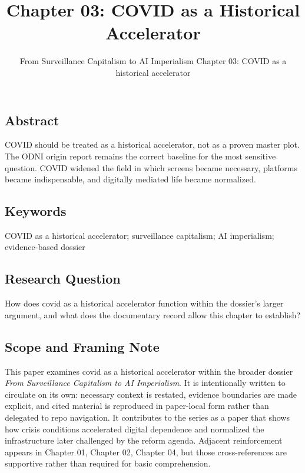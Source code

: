 \documentclass[
  american,
  11pt,
  letterpaper,
]{article}
\title{Chapter 03: COVID as a Historical Accelerator}
\subtitle{From Surveillance Capitalism to AI Imperialism \textbar{}
Chapter 03: COVID as a historical accelerator}
\author{}
\date{}
\begin{document}
\maketitle

\subsection{Abstract}\label{abstract}

COVID should be treated as a historical accelerator, not as a proven
master plot. The ODNI origin report remains the correct baseline for the
most sensitive question. COVID widened the field in which screens became
necessary, platforms became indispensable, and digitally mediated life
became normalized.

\subsection{Keywords}\label{keywords}

COVID as a historical accelerator; surveillance capitalism; AI
imperialism; evidence-based dossier

\subsection{Research Question}\label{research-question}

How does covid as a historical accelerator function within the dossier's
larger argument, and what does the documentary record allow this chapter
to establish?

\subsection{Scope and Framing Note}\label{scope-and-framing-note}

This paper examines covid as a historical accelerator within the broader
dossier \emph{From Surveillance Capitalism to AI Imperialism}. It is
intentionally written to circulate on its own: necessary context is
restated, evidence boundaries are made explicit, and cited material is
reproduced in paper-local form rather than delegated to repo navigation.
It contributes to the series as a paper that shows how crisis conditions
accelerated digital dependence and normalized the infrastructure later
challenged by the reform agenda. Adjacent reinforcement appears in
Chapter 01, Chapter 02, Chapter 04, but those cross-references are
supportive rather than required for basic comprehension.
\end{document}
